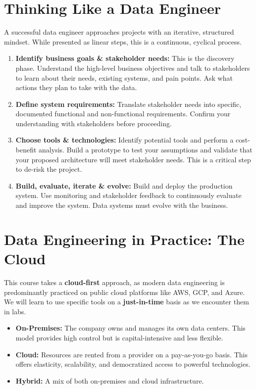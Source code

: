 \documentclass{article}
\begin{document}
\section{Thinking Like a Data Engineer}
A successful data engineer approaches projects with an iterative, structured mindset. While presented as linear steps, this is a continuous, cyclical process.
\begin{enumerate}
    \item \textbf{Identify business goals \& stakeholder needs:} This is the discovery phase. Understand the high-level business objectives and talk to stakeholders to learn about their needs, existing systems, and pain points. Ask what actions they plan to take with the data.
    \item \textbf{Define system requirements:} Translate stakeholder needs into specific, documented functional and non-functional requirements. Confirm your understanding with stakeholders before proceeding.
    \item \textbf{Choose tools \& technologies:} Identify potential tools and perform a cost-benefit analysis. Build a prototype to test your assumptions and validate that your proposed architecture will meet stakeholder needs. This is a critical step to de-risk the project.
    \item \textbf{Build, evaluate, iterate \& evolve:} Build and deploy the production system. Use monitoring and stakeholder feedback to continuously evaluate and improve the system. Data systems must evolve with the business.
\end{enumerate}

\section{Data Engineering in Practice: The Cloud}
This course takes a \textbf{cloud-first} approach, as modern data engineering is predominantly practiced on public cloud platforms like AWS, GCP, and Azure. We will learn to use specific tools on a \textbf{just-in-time} basis as we encounter them in labs.
\begin{itemize}
    \item \textbf{On-Premises:} The company owns and manages its own data centers. This model provides high control but is capital-intensive and less flexible.
    \item \textbf{Cloud:} Resources are rented from a provider on a pay-as-you-go basis. This offers elasticity, scalability, and democratized access to powerful technologies.
    \item \textbf{Hybrid:} A mix of both on-premises and cloud infrastructure.
\end{itemize}
\end{document}
